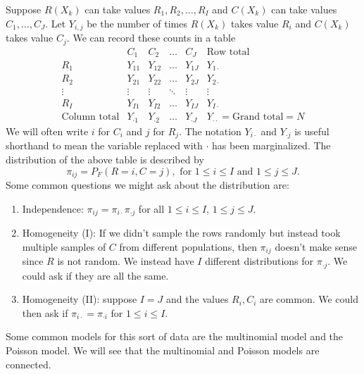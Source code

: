 Suppose $R(X_k)$ can take values $R_1,R_2,\ldots,R_I$ and $C(X_k)$ can take values $C_1,\ldots,C_J$. Let $Y_{i,j}$ be the number of times $R(X_k)$ takes value $R_i$ and $C(X_k)$ takes value  $C_j$. We can record these counts in a table
\[\begin{array}{c|cccc|c}
    &C_1&C_2&\ldots&C_J&\text{Row total}\\
    \hline
R_1 &Y_{11}&Y_{12}&\ldots&Y_{1J}&Y_{1\cdot}\\
R_2&Y_{21}&Y_{22}&\ldots&Y_{2J}&Y_{2\cdot}\\
\vdots&\vdots&\vdots&\ddots&\vdots&\vdots \\
R_I&Y_{I1}&Y_{I2}&\ldots&Y_{IJ}&Y_{I\cdot}\\
\hline 
\text{Column total}& Y_{\cdot 1}&Y_{\cdot 2}&\ldots &Y_{\cdot J} & Y_{\cdot\cdot}=\text{Grand total}=N
\end{array} \]
We will often write $i$ for $C_i$ and $j$ for $R_j$. The notation $Y_{i\cdot}$ and $Y_{\cdot j}$ is useful shorthand to mean the variable replaced with $\cdot$ has been marginalized. The distribution of the above table is described by 
\[\pi_{ij} = P_F(R=i, C=j), \text{ for } 1 \le i \le I \text{ and } 1 \le j \le J. \]
Some common questions we might ask about the distribution are:
\begin{enumerate}
    \item Independence: $\pi_{ij} = \pi_{i \cdot}\pi_{\cdot j}$ for all $1 \le i \le I$, $1 \le j \le J$.
    \item Homogeneity (I): If we didn't sample the rows randomly but instead took multiple samples of $C$ from different populations, then $\pi_{ij}$ doesn't make sense since $R$ is not random. We instead have $I$ different distributions for $\pi_{\cdot j}$. We could ask if they are all the same.
    \item Homogeneity (II): suppose $I=J$ and the values $R_i,C_i$ are common. We could then ask if $\pi_{i \cdot} = \pi_{\cdot i}$ for $1 \le i \le I$. 
\end{enumerate}
Some common models for this sort of data are the multinomial model and the Poisson model. We will see that the multinomial and Poisson models are connected.
